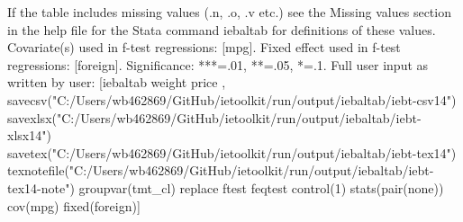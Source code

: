 If the table includes missing values (.n, .o, .v etc.) see the Missing values section in the help file for the Stata command iebaltab for definitions of these values. Covariate(s) used in f-test regressions: [mpg]. Fixed effect used in f-test regressions: [foreign]. Significance: ***=.01, **=.05, *=.1. Full user input as written by user: [iebaltab weight price , savecsv("C:/Users/wb462869/GitHub/ietoolkit/run/output/iebaltab/iebt-csv14") savexlsx("C:/Users/wb462869/GitHub/ietoolkit/run/output/iebaltab/iebt-xlsx14") savetex("C:/Users/wb462869/GitHub/ietoolkit/run/output/iebaltab/iebt-tex14") texnotefile("C:/Users/wb462869/GitHub/ietoolkit/run/output/iebaltab/iebt-tex14-note") groupvar(tmt\_cl) replace ftest feqtest control(1) stats(pair(none)) cov(mpg) fixed(foreign)] 
